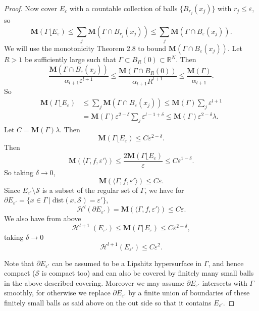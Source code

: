 \documentclass{amsart}
\numberwithin{equation}{section}
\theoremstyle{definition}
\theoremstyle{remark}
\begin{document}
\begin{proof}
Now cover $E_\varepsilon$ with a countable collection of balls $\{B_{r_j}(x_j) \}$ with $r_j \leq \varepsilon$, so
\[ \mathbf{M}(\Gamma\lfloor E_\varepsilon) \leq \sum_j \mathbf{M}(\Gamma \cap B_{r_j}(x_j)) 
\leq \sum_j \mathbf{M}(\Gamma \cap B_\varepsilon(x_j)).\]
We will use the monotonicity Theorem 2.8 to bound $\mathbf{M}(\Gamma \cap B_\varepsilon(x_j))$. 
Let $R>1$ be {{sufficiently large}} such that $\Gamma \subset B_R(0) \subset \mathbb{R}^N$. Then
\[ \frac{\mathbf{M}(\Gamma \cap B_\varepsilon(x_j))}{\alpha_{l+1} \varepsilon^{l+1}} \le
\frac{\mathbf{M}(\Gamma \cap B_R(0))}{\alpha_{l+1}R^{l+1}} 
\le \frac{\mathbf{M} (\Gamma)}{\alpha_{l+1}}. \]
So
\begin{align*}\mathbf{M}(\Gamma\lfloor E_\varepsilon) &\leq \sum_j \mathbf{M}(\Gamma \cap B_\varepsilon(x_j))
\leq  \mathbf{M}(\Gamma) \sum_j \varepsilon^{l+1}\\
&= \mathbf{M}(\Gamma)\varepsilon^{2-\delta} \sum_j \varepsilon^{l-1+\delta} \le
\mathbf{M}(\Gamma)\varepsilon^{2-\delta}\lambda.
\end{align*}
Let $C = \mathbf{M}(\Gamma)\lambda$. Then 
\[ \mathbf{M}(\Gamma\lfloor E_\varepsilon) \le C \varepsilon^{2-\delta} .\]
Then
\[ \mathbf{M}(\langle \Gamma, f, \varepsilon' \rangle ) \leq \frac{2\mathbf{M}(\Gamma\lfloor E_\varepsilon)}{\varepsilon} 
\le C \varepsilon^{1-\delta} .\]
So taking $\delta \to 0$,
\[\textbf{M}(\langle \Gamma, f, \varepsilon' \rangle ) \leq C\varepsilon. \]
Since $E_{\varepsilon'}\setminus \mathcal{S}$ is a subset of the regular set of $\Gamma$, we have 
for $\partial E_{\varepsilon'} =\big\{x \in \Gamma\ \big|\  \text{dist}(x,\mathcal{S})=\varepsilon' \big\}$,
\[ \mathcal{H}^{l}  (\partial E_{\varepsilon'}) = \mathbf{M}(\langle \Gamma, f, \varepsilon' \rangle ) \leq C\varepsilon .\]
We also have from above
\[  \mathcal{H}^{l+1} \; (E_{\varepsilon'}) \le\mathbf{M}(\Gamma\lfloor E_{\varepsilon}) \le C \varepsilon^{2-\delta}, \]
taking $\delta \to 0$
\[ \mathcal{H}^{l+1}(E_{\varepsilon'}) \le C \varepsilon^2.\]


Note that $\partial E_{\varepsilon'}$ can be assumed to be a Lipshitz hypersurface in $\Gamma$, and hence compact ($\mathcal{S}$ is compact too) and can also be covered by finitely many small balls in the above described covering. Moreover we may assume 
$\partial E_{\varepsilon'}$ intersects with $\Gamma$ smoothly, for otherwise we replace 
$\partial E_{\varepsilon'}$ by a finite union of boundaries of these finitely small balls as said above on the out side 
so that it contains $E_{\varepsilon'}$.
\end{proof}
\end{document}
